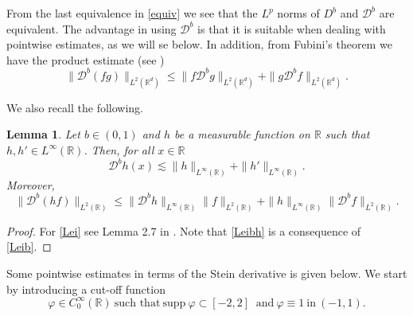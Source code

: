 \documentclass[reqno]{amsart}
\newcommand{\R}{\mathbb R}
\numberwithin{equation}{section}
\newtheorem{lemma}[theorem]{Lemma}
\begin{document}
 From the last equivalence in
\eqref{equiv} we see that the $L^p$ norms of $D^b$ and $\mathcal{D}^{b}$ are equivalent. The advantage in using $\mathcal{D}^{b}$	is that it is suitable when dealing with pointwise  estimates, as we will se below. In addition, from  Fubini's theorem we have the product estimate (see \cite[Proposition 1]{NahasPonce})
\begin{equation}\label{Leib}
\|\mathcal{D}^{b}(fg)\|_{L^2(\R^d)} \leq \|f\mathcal{D}^{b}g\|_{L^2(\R^d)} + \|g\mathcal{D}^{b}f\|_{L^2(\R^d)}.
\end{equation}

We also recall the following.

\begin{lemma}\label{Leibnitz}
Let $b\in (0,1)$ and $h$ be a measurable function on $\R$ such that $h,h'\in L^{\infty}(\R)$. Then, for all $x\in \R$
\begin{equation}\label{Lei}
\mathcal{D}^b h(x)\lesssim \|h\|_{L^{\infty}(\R)}+\|h'\|_{L^\infty(\R)}.
\end{equation}
Moreover,
\begin{equation}\label{Leibh}
\|\mathcal{D}^{b}(h f)\|_{L^2(\R)} \leq \|\mathcal {D}^b h\|_{L^\infty(\R)} \|f\|_{L^2(\R)} + \|h\|_{L^\infty(\R)} \|\mathcal{D}^{b}f\|_{L^2(\R)}.
\end{equation}
\end{lemma}
\begin{proof}
For \eqref{Lei} see Lemma 2.7 in  \cite{pastran}. Note that \eqref{Leibh} is a consequence of \eqref{Leib}.
\end{proof}



Some pointwise estimates in terms of the Stein derivative is given below. We start by introducing a cut-off function 
\begin{equation}\label{varphi}
\varphi\in C_0^\infty(\R) \ \mbox{such that}\ \mbox{supp}\ \varphi\subset [-2,2] \ \mbox{ and} \ \varphi\equiv1 \ \mbox{in}  \ (-1,1).
\end{equation}
\end{document}
